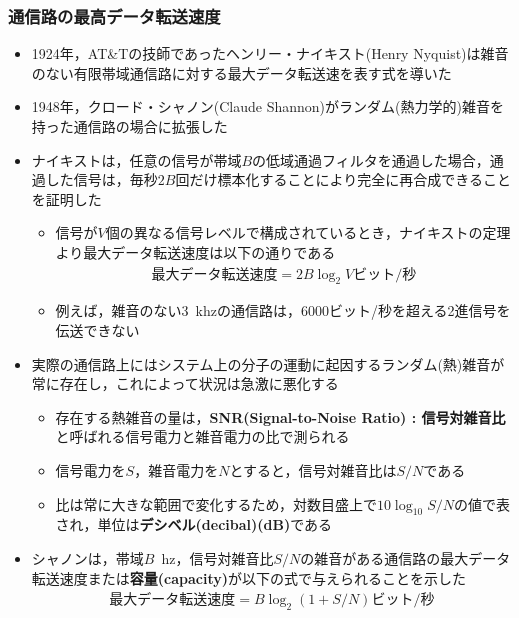 \documentclass[a4paper]{ltjsarticle}
\begin{document}
    \subsubsection{通信路の最高データ転送速度}
      \begin{itemize}
        \item 1924年，AT\&Tの技師であったヘンリー・ナイキスト(Henry Nyquist)は雑音のない有限帯域通信路に対する最大データ転送速を表す式を導いた
        \item 1948年，クロード・シャノン(Claude Shannon)がランダム(熱力学的)雑音を持った通信路の場合に拡張した
        \item ナイキストは，任意の信号が帯域$B$の低域通過フィルタを通過した場合，通過した信号は，毎秒$2B$回だけ標本化することにより完全に再合成できることを証明した
        \begin{itemize}
          \item 信号が$V$個の異なる信号レベルで構成されているとき，ナイキストの定理より最大データ転送速度は以下の通りである
            \begin{align}
              \text{最大データ転送速度} = 2B \log_2 V \text{ビット/秒}
            \end{align}
          \item 例えば，雑音のない\SI{3}{khz}の通信路は，6000ビット/秒を超える2進信号を伝送できない
        \end{itemize}
        \item 実際の通信路上にはシステム上の分子の運動に起因するランダム(熱)雑音が常に存在し，これによって状況は急激に悪化する
        \begin{itemize}
          \item 存在する熱雑音の量は，\textbf{SNR(Signal-to-Noise Ratio) : 信号対雑音比}と呼ばれる信号電力と雑音電力の比で測られる
          \item 信号電力を$S$，雑音電力を$N$とすると，信号対雑音比は$S/N$である
          \item 比は常に大きな範囲で変化するため，対数目盛上で$10 \log_{10} S/N$の値で表され，単位は\textbf{デシベル(decibal)(dB)}である
        \end{itemize}
        \item シャノンは，帯域$B$\SI{}{hz}，信号対雑音比$S/N$の雑音がある通信路の最大データ転送速度または\textbf{容量(capacity)}が以下の式で与えられることを示した
          \begin{align}
            \text{最大データ転送速度} = B \log_2 (1+S/N) \text{ビット/秒}
          \end{align}
      \end{itemize}
\end{document}
